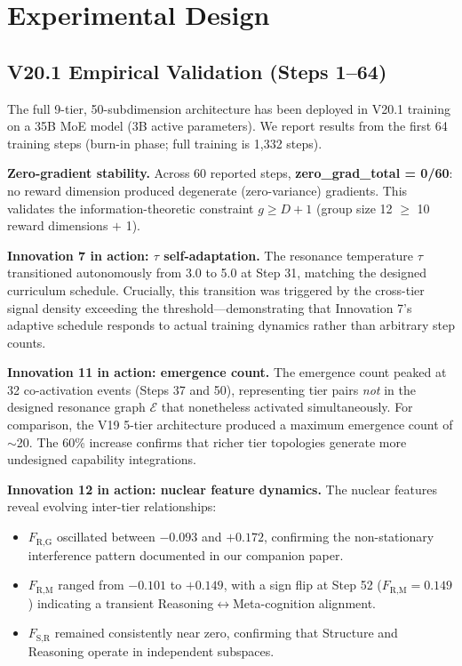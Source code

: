 \documentclass{article}
\begin{document}
\section{Experimental Design}

\subsection{V20.1 Empirical Validation (Steps 1--64)}

The full 9-tier, 50-subdimension architecture has been deployed in V20.1 training on a 35B MoE model (3B active parameters). We report results from the first 64 training steps (burn-in phase; full training is 1{,}332 steps).

\textbf{Zero-gradient stability.} Across 60 reported steps, \textbf{zero\_grad\_total = 0/60}: no reward dimension produced degenerate (zero-variance) gradients. This validates the information-theoretic constraint $g \geq D + 1$ (group size 12 $\geq$ 10 reward dimensions $+$ 1).

\textbf{Innovation 7 in action: $\tau$ self-adaptation.} The resonance temperature $\tau$ transitioned autonomously from 3.0 to 5.0 at Step 31, matching the designed curriculum schedule. Crucially, this transition was triggered by the cross-tier signal density exceeding the threshold---demonstrating that Innovation 7's adaptive schedule responds to actual training dynamics rather than arbitrary step counts.

\textbf{Innovation 11 in action: emergence count.} The emergence count peaked at 32 co-activation events (Steps 37 and 50), representing tier pairs \textit{not} in the designed resonance graph $\mathcal{E}$ that nonetheless activated simultaneously. For comparison, the V19 5-tier architecture produced a maximum emergence count of $\sim$20. The 60\% increase confirms that richer tier topologies generate more undesigned capability integrations.

\textbf{Innovation 12 in action: nuclear feature dynamics.} The nuclear features reveal evolving inter-tier relationships:
\begin{itemize}
    \item $F_{\text{R,G}}$ oscillated between $-0.093$ and $+0.172$, confirming the non-stationary interference pattern documented in our companion paper.
    \item $F_{\text{R,M}}$ ranged from $-0.101$ to $+0.149$, with a sign flip at Step 52 ($F_{\text{R,M}} = 0.149$) indicating a transient Reasoning$\leftrightarrow$Meta-cognition alignment.
    \item $F_{\text{S,R}}$ remained consistently near zero, confirming that Structure and Reasoning operate in independent subspaces.
\end{itemize}
\end{document}
